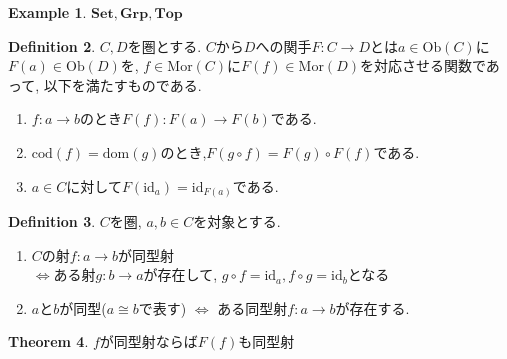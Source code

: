 \documentclass[a4paper,10pt]{article}
\theoremstyle{definition}
\newtheorem{thm}{\bfseries Theorem}[section]
\newtheorem{definition}[thm]{\bfseries Definition}
\newtheorem{exmp}[thm]{\bfseries Example}
\begin{document}
\begin{exmp}
    $\mathbf{Set}, \mathbf{Grp}, \mathbf{Top}$
\end{exmp}
\begin{definition}
    $C,D$を圏とする. $C$から$D$への関手$F:C \rightarrow D$とは$a \in \mathrm{Ob}(C)$に$F(a) 
    \in \mathrm{Ob}(D)$を, 
    $f \in \mathrm{Mor}(C)$に$F(f) \in \mathrm{Mor}(D)$を対応させる関数であって, 以下を満たすものである.
    \begin{enumerate}[(1)]
        \item $f: a \rightarrow b$のとき$F(f): F(a) \rightarrow F(b)$である.
        \item $\mathrm{cod}(f) = \mathrm{dom}(g)$のとき,$F(g \circ f)= F(g) \circ F(f)$である.
        \item $a \in C$に対して$F(\mathrm{id}_a) = \mathrm{id}_{F(a)}$である.
    \end{enumerate}
\end{definition}
\begin{definition}
    $C$を圏, $a,b \in C$を対象とする.
    \begin{enumerate}[(1)]
        \item $C$の射$f:a \rightarrow b$が同型射\\
        $\Longleftrightarrow$ある射$g:b \rightarrow a$が存在して, $g \circ f = \mathrm{id}_a, f \circ g = \mathrm{id}_b$となる
        \item $a$と$b$が同型($a \cong b$で表す) $\Longleftrightarrow$ ある同型射$f:a \rightarrow b$が存在する.
    \end{enumerate}
\end{definition}
\begin{thm}
    $f$が同型射ならば$F(f)$も同型射
\end{thm}
\end{document}
